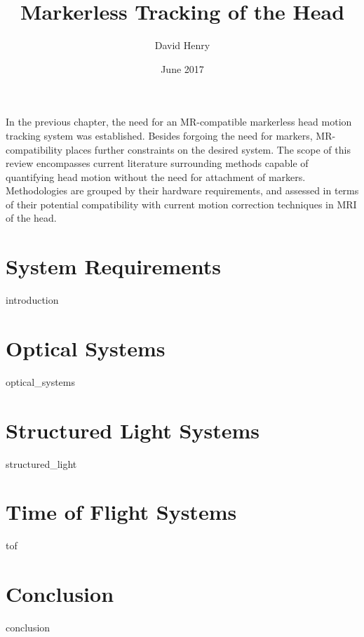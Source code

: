 \documentclass{article}
\title{Markerless Tracking of the Head}
\author{David Henry}
\date{June 2017}
\begin{document}
\maketitle
In the previous chapter, the need for an MR-compatible markerless head motion tracking system was established. Besides forgoing the need for markers, MR-compatibility places further constraints on the desired system. The scope of this review encompasses current literature surrounding methods capable of quantifying head motion without the need for attachment of markers. Methodologies are grouped by their hardware requirements, and assessed in terms of their potential compatibility with current motion correction techniques in MRI of the head.


\section{System Requirements} \label{Section1}
{introduction}

\section{Optical Systems} \label{Section2}
{optical_systems}

\section{Structured Light Systems} \label{Section3}
{structured_light}

\section{Time of Flight Systems} \label{Section4}
{tof}

\section{Conclusion} \label{Section5}
{conclusion}

\printbibliography
\end{document}
